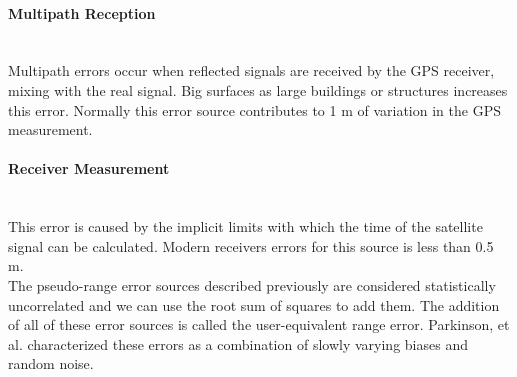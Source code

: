 \paragraph{Multipath Reception} \hspace{0pt} \\
Multipath errors occur when reflected signals are received by the GPS receiver, mixing with the real signal. Big surfaces as large buildings or structures increases this error. Normally this error source contributes to 1 m of variation in the GPS measurement.


\paragraph{Receiver Measurement} \hspace{0pt} \\
This error is caused by the implicit limits with which the time of the satellite signal can be calculated. Modern receivers errors for this source is less than 0.5 m. \\

The pseudo-range error sources described previously are considered statistically uncorrelated and we can use the root sum of squares to add them. The addition of all of these error sources is called the user-equivalent range error. Parkinson, et al. \cite{Parkinson1996} characterized these errors as a combination of slowly varying biases and random noise.

